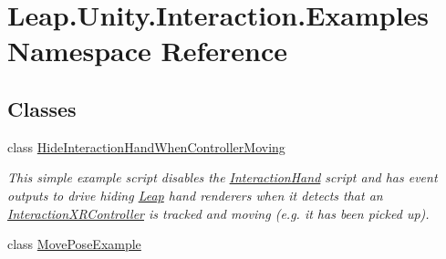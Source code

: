 \hypertarget{namespace_leap_1_1_unity_1_1_interaction_1_1_examples}{}\section{Leap.\+Unity.\+Interaction.\+Examples Namespace Reference}
\label{namespace_leap_1_1_unity_1_1_interaction_1_1_examples}
\subsection*{Classes}
\begin{DoxyCompactItemize}
\item 
class \mbox{\hyperlink{class_leap_1_1_unity_1_1_interaction_1_1_examples_1_1_hide_interaction_hand_when_controller_moving}{Hide\+Interaction\+Hand\+When\+Controller\+Moving}}
\begin{DoxyCompactList}\small\item\em This simple example script disables the \mbox{\hyperlink{class_leap_1_1_unity_1_1_interaction_1_1_interaction_hand}{Interaction\+Hand}} script and has event outputs to drive hiding \mbox{\hyperlink{namespace_leap_1_1_unity_1_1_leap}{Leap}} hand renderers when it detects that an \mbox{\hyperlink{class_leap_1_1_unity_1_1_interaction_1_1_interaction_x_r_controller}{Interaction\+X\+R\+Controller}} is tracked and moving (e.\+g. it has been picked up). \end{DoxyCompactList}\item 
class \mbox{\hyperlink{class_leap_1_1_unity_1_1_interaction_1_1_examples_1_1_move_pose_example}{Move\+Pose\+Example}}
\end{DoxyCompactItemize}
